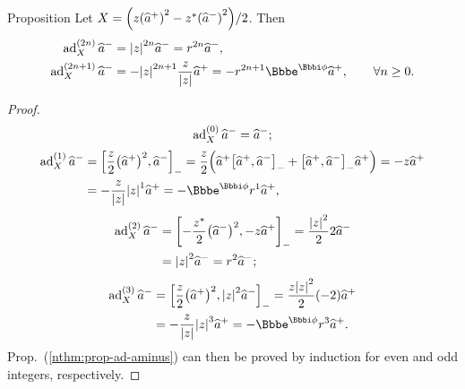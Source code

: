 \begin{namedthm}{Proposition}
	\label{nthm:prop-ad-aminus}
Let $X = {\left(z{\left(\widehat{a}^+\right)}^2 - z^*{\left(\widehat{a}^-\right)}^2\right)}/2$. Then
\begin{align}
	\ad_X^{(2n)} \widehat{a}^- &= \vbr{z}^{2n} \widehat{a}^-
	= r^{2n} \widehat{a}^-,\\
	\ad_X^{(2n+1)} \widehat{a}^-
	&= -\vbr{z}^{2n+1}\frac{z}{\vbr{z}}\widehat{a}^+
	= - r^{2n+1} \ee^{\ii\phi} \widehat{a}^+,
	\qquad \forall n \ge 0.
\end{align}
\end{namedthm} %
\begin{proof}
	\begin{equation}
		\operatorname{ad}_X^{(0)}\widehat{a}^- = \widehat{a}^-;
	\end{equation}
	\begin{align}
		\ad_X^{(1)}\widehat{a}^- &=
		\sbr{\frac{z}{2}\rbr{\widehat{a}^+}^2, \widehat{a}^-}_- 
		= \frac{z}{2}\rbr{\widehat{a}^+ \sbr{\widehat{a}^+, \widehat{a}^-}_-
		+ \sbr{\widehat{a}^+, \widehat{a}^-}_- \widehat{a}^+}
		= -z\widehat{a}^+ \nonumber \\
		&= -\frac{z}{\vbr{z}}\vbr{z}^1\widehat{a}^+
		= -\ee^{\ii\phi} r^1 \widehat{a}^+,
	\end{align}
	\begin{align}
		\operatorname{ad}_X^{(2)}\widehat{a}^- &=
		{\left[-\frac{z^*}{2}{\left(\widehat{a}^-\right)}^2, -z\widehat{a}^+\right]}_-
		= \frac{{\left|z\right|}^2}{2} 2\widehat{a}^- \nonumber \\
		&= {\left|z\right|}^2\widehat{a}^- = r^2 \widehat{a}^-;
	\end{align}
	\begin{align}
		\ad_X^{(3)}\widehat{a}^- &=
		\sbr{\frac{z}{2}\rbr{\widehat{a}^+}^2, \vbr{z}^2\widehat{a}^-}_-
		= \frac{z\vbr{z}^2}{2} \rbr{-2} \widehat{a}^+ \nonumber \\
		&= -\frac{z}{\vbr{z}}\vbr{z}^3\widehat{a}^+
		= -\ee^{\ii\phi} r^3 \widehat{a}^+.
	\end{align}
	Prop.~(\ref{nthm:prop-ad-aminus}) can then be proved by induction for 
	even and odd integers, respectively.
\end{proof}

